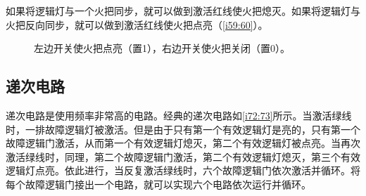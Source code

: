 如果将逻辑灯与一个火把同步，就可以做到激活红线使火把熄灭。如果将逻辑灯与火把反向同步，就可以做到激活红线使火把点亮（\autoref{i59:60}）。

\begin{figure}[!h]
\begin{center}
\end{center}
\caption{左边开关使火把点亮（置1），右边开关使火把关闭（置0）。}
\label{i59:60}
\end{figure}

\subsection{递次电路}

递次电路是使用频率非常高的电路。经典的递次电路如\autoref{i72:73}所示。当激活绿线时，一排故障逻辑灯被激活。但是由于只有第一个有效逻辑灯是亮的，只有第一个故障逻辑门激活，从而第一个有效逻辑灯熄灭，第二个有效逻辑灯被点亮。当再次激活绿线时，同理，第二个故障逻辑门激活，第二个有效逻辑灯熄灭，第三个有效逻辑灯点亮。依此进行，当反复激活绿线时，六个故障逻辑门依次激活并循环。将每个故障逻辑门接出一个电路，就可以实现六个电路依次运行并循环。

\begin{figure}[!h]
\begin{center}
\end{center}
\caption{}
\label{i72:73}
\end{figure}

